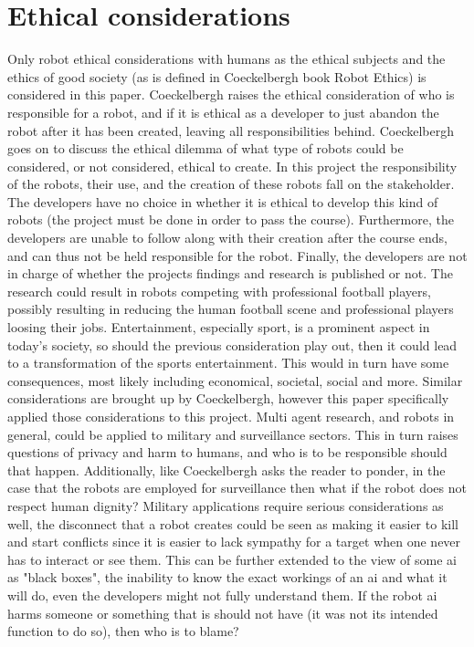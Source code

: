 \section{Ethical considerations}
\label{section:ethical_considerations}

Only robot ethical considerations with humans as the ethical subjects and the ethics of good society (as is defined in Coeckelbergh book Robot Ethics\:\cite{coeckelbergh_robot_2022}) is considered in this paper.
Coeckelbergh\:\cite{coeckelbergh_robot_2022} raises the ethical consideration of who is responsible for a robot, and if it is ethical as a developer to just abandon the robot after it has been created, leaving all responsibilities behind. Coeckelbergh\:\cite{coeckelbergh_robot_2022} goes on to discuss the ethical dilemma of what type of robots could be considered, or not considered, ethical to create.
In this project the responsibility of the robots, their use, and the creation of these robots fall on the stakeholder. The developers have no choice in whether it is ethical to develop this kind of robots (the project must be done in order to pass the course). Furthermore, the developers are unable to follow along with their creation after the course ends, and can thus not be held responsible for the robot. Finally, the developers are not in charge of whether the projects findings and research is published or not.
The research could result in robots competing with professional football players, possibly resulting in reducing the human football scene and professional players loosing their jobs. Entertainment, especially sport, is a prominent aspect in today's society, so should the previous consideration play out, then it could lead to a transformation of the sports entertainment. This would in turn have some consequences, most likely including economical, societal, social and more. Similar considerations are brought up by Coeckelbergh\:\cite{coeckelbergh_robot_2022}, however this paper specifically applied those considerations to this project.
Multi agent research, and robots in general, could be applied to military and surveillance sectors. This in turn raises questions of privacy and harm to humans, and who is to be responsible should that happen. Additionally, like Coeckelbergh\:\cite{coeckelbergh_robot_2022} asks the reader to ponder, in the case that the robots are employed for surveillance then what if the robot does not respect human dignity? Military applications require serious considerations as well, the disconnect that a robot creates could be seen as making it easier to kill and start conflicts since it is easier to lack sympathy for a target when one never has to interact or see them. This can be further extended to the view of some \ac{ai} as "black boxes", the inability to know the exact workings of an \ac{ai} and what it will do, even the developers might not fully understand them. If the robot \ac{ai} harms someone or something that is should not have (it was not its intended function to do so), then who is to blame?


